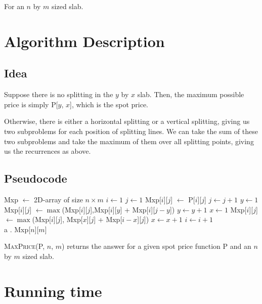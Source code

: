 \documentclass{article}
\begin{document}
For an $n$ by $m$ sized slab.

\section{Algorithm Description}

\subsection{Idea}

Suppose there is no splitting in the $y$ by $x$ slab. Then, the maximum possible price is simply \textsc{P[$y$, $x$]}, which is the spot price.

Otherwise, there is either a horizontal splitting or a vertical splitting, giving us two subproblems for each position of splitting lines. We can take the sum of these two subproblems and take the maximum of them over all splitting points, giving us the recurrences as above.

\subsection{Pseudocode}

\begin{algorithm}[h]
\begin{algorithmic}
    \State Mxp $\gets$ 2D-array of size $n \times m$ 
    \State $i \gets 1$
        \State $j \gets 1$
            \State Mxp[$i$][$j$] $\gets$ P[$i$][$j$]
            \State $j \gets j + 1$
            \State $y \gets 1$
                \State Mxp[$i$][$j$] $\gets \max$(Mxp[$i$][$j$],Mxp[$i$][$y$] + Mxp[$i$][$j-y$])
                \State $y \gets y+1$
            \EndWhile
            \State $x \gets 1$
                \State Mxp[$i$][$j$] $\gets \max$(Mxp[$i$][$j$], Mxp[$x$][$j$] + Mxp[$i-x$][$j$])
                \State $x \gets x+1$
            \EndWhile
        \EndWhile
        \State $i \gets i + 1$
    \EndWhile \\
    \phantom a \phantom . \Return Mxp[$n$][$m$]
\EndFunction
\end{algorithmic}
\end{algorithm}

\textsc{MaxPrice(P, $n$, $m$)} returns the answer for a given spot price function \textsc{P} and an $n$ by $m$ sized slab.

\section{Running time}
\end{document}
